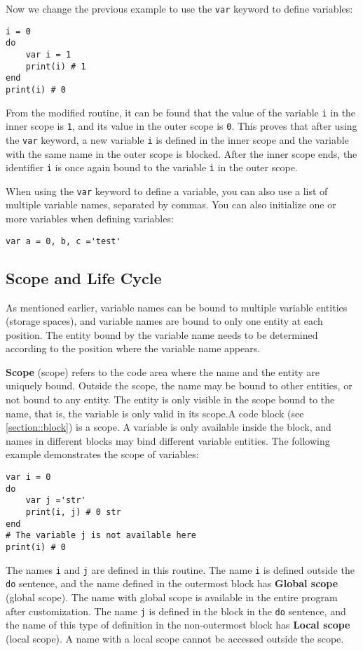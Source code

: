 Now we change the previous example to use the \texttt{var} keyword to define variables:
\begin{lstlisting}[language=berry]
i = 0
do
    var i = 1
    print(i) # 1
end
print(i) # 0
\end{lstlisting}
From the modified routine, it can be found that the value of the variable \texttt{i} in the inner scope is \texttt{1}, and its value in the outer scope is \texttt{0}. This proves that after using the \texttt{var} keyword, a new variable \texttt{i} is defined in the inner scope and the variable with the same name in the outer scope is blocked. After the inner scope ends, the identifier \texttt{i} is once again bound to the variable \texttt{i} in the outer scope.

When using the \texttt{var} keyword to define a variable, you can also use a list of multiple variable names, separated by commas. You can also initialize one or more variables when defining variables:
\begin{lstlisting}[language=berry, numbers=none]
var a = 0, b, c ='test'
\end{lstlisting}

\subsection {Scope and Life Cycle} \label{section::scope_life}

As mentioned earlier, variable names can be bound to multiple variable entities (storage spaces), and variable names are bound to only one entity at each position. The entity bound by the variable name needs to be determined according to the position where the variable name appears.

\textbf{Scope} (scope) refers to the code area where the name and the entity are uniquely bound. Outside the scope, the name may be bound to other entities, or not bound to any entity. The entity is only visible in the scope bound to the name, that is, the variable is only valid in its scope.A code block (see \ref{section::block}) is a scope. A variable is only available inside the block, and names in different blocks may bind different variable entities. The following example demonstrates the scope of variables:
\begin{lstlisting}[language=berry]
var i = 0
do
    var j ='str'
    print(i, j) # 0 str
end
# The variable j is not available here
print(i) # 0
\end{lstlisting}
The names \texttt{i} and \texttt{j} are defined in this routine. The name \texttt{i} is defined outside the \texttt{do} sentence, and the name defined in the outermost block has \textbf{Global scope} (global scope). The name with global scope is available in the entire program after customization. The name \texttt{j} is defined in the block in the \texttt{do} sentence, and the name of this type of definition in the non-outermost block has \textbf{Local scope} (local scope). A name with a local scope cannot be accessed outside the scope.

